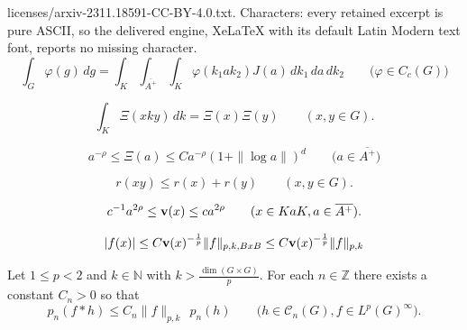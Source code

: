 \documentclass[10pt,a4paper]{amsart}
\newcommand{\N}{\mathbb{N}}
\begin{document}
licenses/arxiv-2311.18591-CC-BY-4.0.txt. Characters: every retained excerpt is pure ASCII, so the delivered engine, XeLaTeX with its default Latin Modern text font, reports no missing character.
\begin{equation}
\label{intpol}
\int_G\varphi(g)\,dg
= \int_{K}\int_{\overline{A^+}}\int_{K}\varphi(k_1ak_2) J(a)\,dk_1\,da\,dk_2
\qquad\big(\varphi\in C_{c}(G)\big)
\end{equation}

\begin{equation}
	\label{mvtxi}
\int_{K}\Xi(xky)\,dk
=\Xi(x)\Xi(y)\qquad(x,y\in G).
\end{equation}

\begin{equation}
\label{sphest}
a^{-\rho}\leq \Xi(a)\le C a^{-\rho}(1+\| \log a\|)^d\qquad \big(a\in \overline{A^+}\big)
\end{equation}

\begin{equation}\label{subadwt}
r(xy)\leq r(x)+r(y)\qquad(x,y\in G).
\end{equation}

\begin{equation}
\label{ballest}
c^{-1}a^{2\rho}\leq {\bf{v}}(x) \leq ca^{2\rho} \qquad (x \in KaK, a\in \overline{A^+}).
\end{equation}

\begin{equation}
	\label{brlemmacon}
	|f(x)|\leq C {\bf{v}}(x)^{-\frac1p}\|f\|_{p,k, BxB}\leq C {\bf{v}}(x)^{-\frac1p}\|f\|_{p,k}
\end{equation}

\begin{lemma}
Let $1\leq p<2$ and $k\in \N$ with $k>\frac{\dim (G\times G)}{p}$. For each $n\in \mathbb{Z}$ there exists a constant $C_{n}>0$ so that
$$
p_n(f\ast h)
\leq C_n\|f\|_{p,k}~~p_n(h)\qquad \big(h\in  \mathcal{C}_n(G), f\in L^p(G)^{\infty}\big).
$$
\end{lemma}
\end{document}
